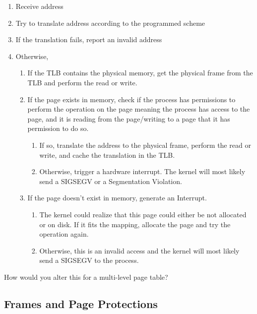 \begin{enumerate}
	\item Receive address
	\item Try to translate address according to the programmed scheme
	\item If the translation fails, report an invalid address
	\item Otherwise,
	      \begin{enumerate}
	      	\item If the TLB contains the physical memory, get the physical frame from the TLB and perform the read or write.
	      	\item If the page exists in memory, check if the process has permissions
	      	      to perform the operation on the page meaning the process has access
	      	      to the page, and it is reading from the page/writing to a page
	      	      that it has permission to do so.
	      	      \begin{enumerate}
	      	      	\item If so, translate the address to the physical frame, perform the read or write, and cache the translation in the TLB.
	      	      	\item Otherwise, trigger a hardware interrupt. The kernel
	      	      	      will most likely send a SIGSEGV or a Segmentation Violation.
	      	      \end{enumerate}
	      	\item If the page doesn't exist in memory, generate an Interrupt.
	      	      \begin{enumerate}
	      	      	\item The kernel could realize that this page could either be not
	      	      	      allocated or on disk.
	      	      	      If it fits the mapping, allocate the page and try the operation again.
	      	      	\item Otherwise, this is an invalid access and the kernel will most likely send a SIGSEGV to the process.
	      	      \end{enumerate}
	      \end{enumerate}
\end{enumerate}
	 
How would you alter this for a multi-level page table?
	 
\subsection{Frames and Page Protections}
	 
